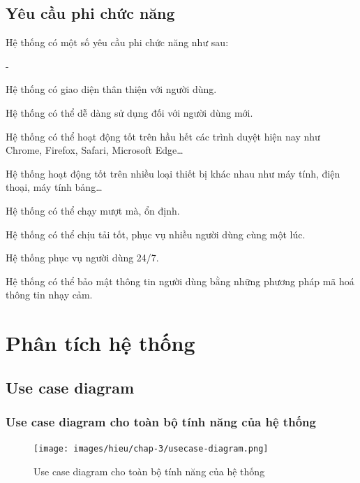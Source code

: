 \subsection{Yêu cầu phi chức năng}
\noindent Hệ thống có một số yêu cầu phi chức năng như sau:
\begin {list} {-}{}
    \item Hệ thống có giao diện thân thiện với người dùng.
    \item Hệ thống có thể dễ dàng sử dụng đối với người dùng mới.
    \item Hệ thống có thể hoạt động tốt trên hầu hết các trình duyệt hiện nay như Chrome, Firefox, Safari, Microsoft Edge\dots
    \item Hệ thống hoạt động tốt trên nhiều loại thiết bị khác nhau như máy tính, điện thoại, máy tính bảng\dots
    \item Hệ thống có thể chạy mượt mà, ổn định.
    \item Hệ thống có thể chịu tải tốt, phục vụ nhiều người dùng cùng một lúc.
    \item Hệ thống phục vụ người dùng 24/7.
    \item Hệ thống có thể bảo mật thông tin người dùng bằng những phương pháp mã hoá thông tin nhạy cảm.
\newpage
\section{Phân tích hệ thống}
\subsection{Use case diagram}
\subsubsection{Use case diagram cho toàn bộ tính năng của hệ thống}
\begin{figure}[H]
    \begin{center}
    \texttt{[image: images/hieu/chap-3/usecase-diagram.png]}
    \vspace*{5mm}
    \caption{Use case diagram cho toàn bộ tính năng của hệ thống}
    \end{center}
\end{figure}
\newpage

\end{list}
